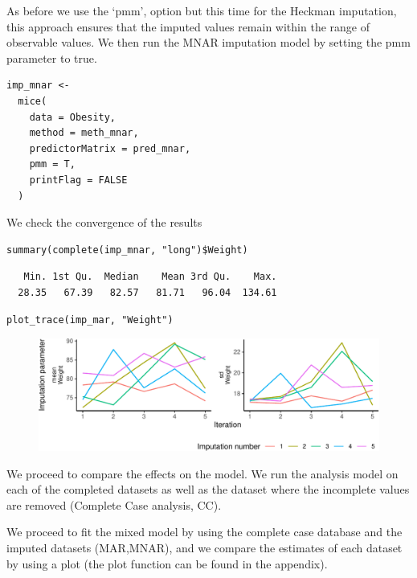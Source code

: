 \documentclass[
  article]{jss}
\begin{document}
As before we use the `pmm', option but this time for the Heckman
imputation, this approach ensures that the imputed values remain within
the range of observable values. We then run the MNAR imputation model by
setting the pmm parameter to true.

\begin{verbatim}
imp_mnar <-
  mice(
    data = Obesity,
    method = meth_mnar,
    predictorMatrix = pred_mnar,
    pmm = T,
    printFlag = FALSE
  )
\end{verbatim}

We check the convergence of the results

\begin{verbatim}
summary(complete(imp_mnar, "long")$Weight)
\end{verbatim}

\begin{verbatim}
   Min. 1st Qu.  Median    Mean 3rd Qu.    Max. 
  28.35   67.39   82.57   81.71   96.04  134.61 
\end{verbatim}

\begin{verbatim}
plot_trace(imp_mar, "Weight")
\end{verbatim}

\begin{figure}[h]

{\centering \includegraphics{manuscript_files/figure-pdf/obesity-predmnarp1-1.pdf}

}

\end{figure}

We proceed to compare the effects on the model. We run the analysis
model on each of the completed datasets as well as the dataset where the
incomplete values are removed (Complete Case analysis, CC).

We proceed to fit the mixed model by using the complete case database
and the imputed datasets (MAR,MNAR), and we compare the estimates of
each dataset by using a plot (the plot function can be found in the
appendix).
\end{document}

